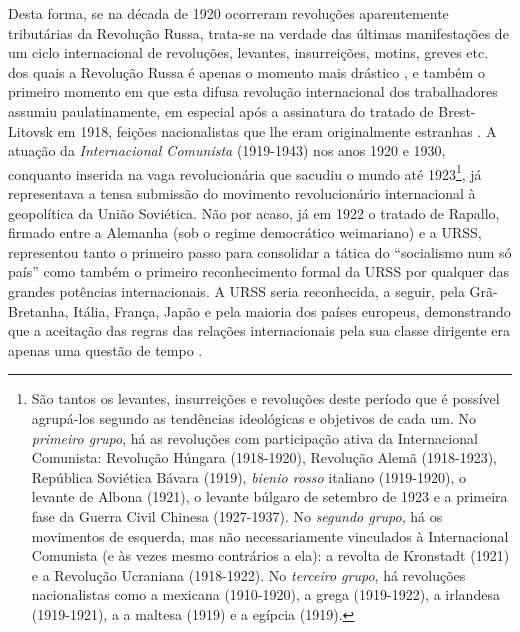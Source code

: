 Desta forma, se na década de 1920 ocorreram revoluções aparentemente tributárias da Revolução Russa, trata-se na verdade das últimas manifestações de um ciclo internacional de revoluções, levantes, insurreições, motins, greves etc. dos quais a Revolução Russa é apenas o momento mais drástico \cite[p.~616]{bernardo_fascismo_2015}, e também o primeiro momento em que esta difusa revolução internacional dos trabalhadores assumiu paulatinamente, em especial após a assinatura do tratado de Brest-Litovsk em 1918, feições nacionalistas que lhe eram originalmente estranhas \cite[p.~618-620]{bernardo_fascismo_2015}. A atuação da \textit{Internacional Comunista} (1919-1943) nos anos 1920 e 1930, conquanto inserida na vaga revolucionária que sacudiu o mundo até 1923\footnote{São tantos os levantes, insurreições e revoluções deste período que é possível agrupá-los segundo as tendências ideológicas e objetivos de cada um. No \textit{primeiro grupo}, há as revoluções com participação ativa da Internacional Comunista: Revolução Húngara (1918-1920), Revolução Alemã (1918-1923), República Soviética Bávara (1919), \textit{bienio rosso} italiano (1919-1920), o levante de Albona (1921), o levante búlgaro de setembro de 1923 e a primeira fase da Guerra Civil Chinesa (1927-1937). No \textit{segundo grupo}, há os movimentos de esquerda, mas não necessariamente vinculados à Internacional Comunista (e às vezes mesmo contrários a ela): a revolta de Kronstadt (1921) e a Revolução Ucraniana (1918-1922). No \textit{terceiro grupo}, há revoluções nacionalistas como a mexicana (1910-1920), a grega (1919-1922), a irlandesa (1919-1921), a a maltesa (1919) e a egípcia (1919).}, já representava a tensa submissão do movimento revolucionário internacional à geopolítica da União Soviética. Não por acaso, já em 1922 o tratado de Rapallo, firmado entre a Alemanha (sob o regime democrático weimariano) e a URSS, representou tanto o primeiro passo para consolidar a tática do ``socialismo num só país'' como também o primeiro reconhecimento formal da URSS por qualquer das grandes potências internacionais. A URSS seria reconhecida, a seguir, pela Grã-Bretanha, Itália, França, Japão e pela maioria dos países europeus, demonstrando que a aceitação das regras das relações internacionais pela sua classe dirigente era apenas uma questão de tempo \cite[p.~72-77]{carr_relations_1937}.

